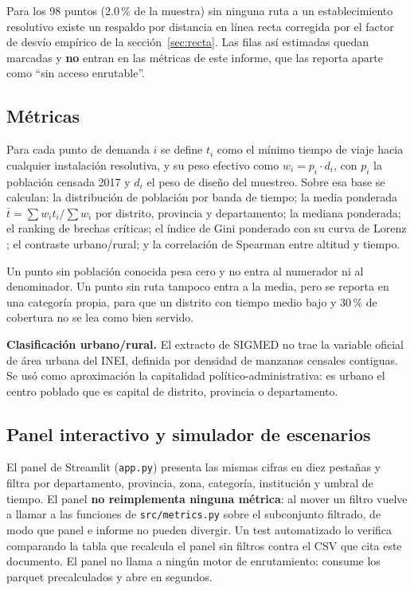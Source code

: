 \documentclass[11pt,a4paper]{article}
\begin{document}
\begin{table}[H]
\centering
\caption{Enganche de los puntos a la red vial, por perfil.}
\label{tab:snapping}
\footnotesize

\end{table}

Para los 98 puntos (2.0\,\% de la muestra) sin ninguna ruta a un
establecimiento resolutivo existe un respaldo por distancia en línea recta
corregida por el factor de desvío empírico de la sección~\ref{sec:recta}. Las
filas así estimadas quedan marcadas y \textbf{no} entran en las métricas de
este informe, que las reporta aparte como ``sin acceso enrutable''.

\subsection{Métricas}

Para cada punto de demanda $i$ se define $t_i$ como el mínimo tiempo de viaje
hacia cualquier instalación resolutiva, y su peso efectivo como
$w_i = p_i \cdot d_i$, con $p_i$ la población censada 2017 y $d_i$ el peso de
diseño del muestreo. Sobre esa base se calculan: la distribución de población
por banda de tiempo; la media ponderada $\bar{t} = \sum w_i t_i / \sum w_i$
por distrito, provincia y departamento; la mediana ponderada; el ranking de
brechas críticas; el índice de Gini ponderado con su curva de Lorenz
\cite{lorenz,gini}; el contraste urbano/rural; y la correlación de Spearman
entre altitud y tiempo.

Un punto sin población conocida pesa cero y no entra al numerador ni al
denominador. Un punto sin ruta tampoco entra a la media, pero se reporta en
una categoría propia, para que un distrito con tiempo medio bajo y 30\,\% de
cobertura no se lea como bien servido.

\textbf{Clasificación urbano/rural.} El extracto de SIGMED no trae la variable
oficial de área urbana del INEI, definida por densidad de manzanas censales
contiguas. Se usó como aproximación la capitalidad político-administrativa: es
urbano el centro poblado que es capital de distrito, provincia o departamento.

\subsection{Panel interactivo y simulador de escenarios}
\label{sec:simulador}

El panel de Streamlit (\texttt{app.py}) presenta las mismas cifras en diez
pestañas y filtra por departamento, provincia, zona, categoría, institución y
umbral de tiempo. El panel \textbf{no reimplementa ninguna métrica}: al mover
un filtro vuelve a llamar a las funciones de \texttt{src/metrics.py} sobre el
subconjunto filtrado, de modo que panel e informe no pueden divergir. Un test
automatizado lo verifica comparando la tabla que recalcula el panel sin
filtros contra el CSV que cita este documento. El panel no llama a ningún
motor de enrutamiento: consume los parquet precalculados y abre en segundos.
\end{document}
